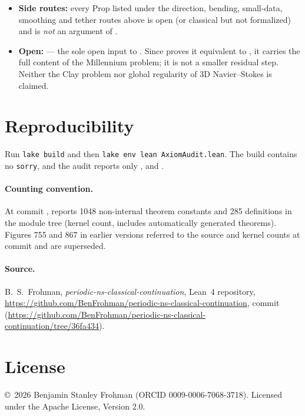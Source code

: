 \documentclass[11pt]{article}
\begin{document}
\begin{itemize}
\item \textbf{Side routes:} every Prop listed under the direction, bending, small-data, smoothing and tether routes above is open (or classical but not formalized) and is \emph{not} an argument of .\item \textbf{Open:}  --- the sole open input to . Since  proves it equivalent to , it carries the full content of the Millennium problem; it is not a smaller residual step. Neither the Clay problem nor global regularity of 3D Navier--Stokes is claimed.
\end{itemize}

\section*{Reproducibility}
Run \texttt{lake build} and then \texttt{lake env lean AxiomAudit.lean}. The build contains no \texttt{sorry}, and the audit reports only ,  and .

\paragraph{Counting convention.} At commit ,  reports 1048 non-internal theorem constants and 285 definitions in the  module tree (kernel count, includes automatically generated theorems). Figures 755 and 867 in earlier versions referred to the source and kernel counts at commit  and are superseded.

\paragraph{Source.} B.~S.~Frohman, \emph{periodic-ns-classical-continuation}, Lean~4 repository, \url{https://github.com/BenFrohman/periodic-ns-classical-continuation}, commit  (\url{https://github.com/BenFrohman/periodic-ns-classical-continuation/tree/36fa434}).

\section*{License}
\copyright\ 2026 Benjamin Stanley Frohman (ORCID 0009-0006-7068-3718). Licensed under the Apache License, Version 2.0.
\end{document}
